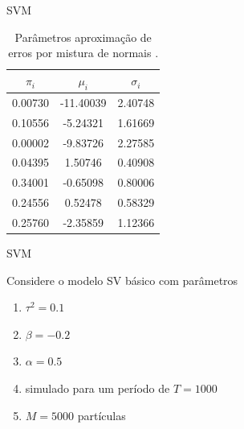 \documentclass{beamer}
\begin{document}
\begin{frame}{SVM}

\begin{table}[ht]
\centering
\begin{tabular}{ccc}
   \hline
  \hline
$\pi_i$ & $\mu_i$ & $\sigma_i$ \\ 
  \hline
0.00730 & -11.40039 & 2.40748 \\ 
  0.10556 & -5.24321 & 1.61669 \\ 
  0.00002 & -9.83726 & 2.27585 \\ 
  0.04395 & 1.50746 & 0.40908 \\ 
  0.34001 & -0.65098 & 0.80006 \\ 
  0.24556 & 0.52478 & 0.58329 \\ 
  0.25760 & -2.35859 & 1.12366 \\ 
   \hline
      \hline
\end{tabular}
      \caption{\scriptsize{ Parâmetros aproximação de erros por mistura de normais \citep{Kim1998}.}}
\label{tab:mixnormal}
\end{table}

\end{frame}


\begin{frame}{SVM}

Considere o modelo SV básico com parâmetros 
\begin{enumerate}
\item $\tau^2=0.1$
\item $\beta=-0.2$ 
\item $\alpha=0.5$ 
\item simulado para um período de $T=1000$
\item $M=5000$ partículas
\end{enumerate}


\end{frame}
\end{document}
